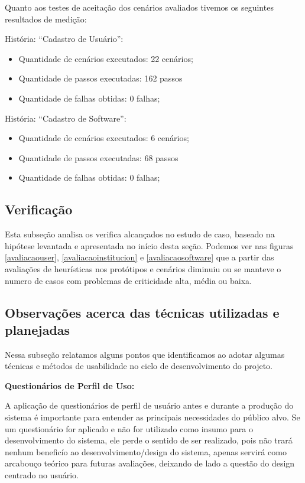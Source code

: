 \newpage
Quanto aos testes de aceitação dos cenários avaliados tivemos os seguintes resultados de medição:

História: ``Cadastro de Usuário'':
\begin{itemize}
	\item Quantidade de cenários executados: 22 cenários;
	\item Quantidade de passos executadas: 162 passos
	\item Quantidade de falhas obtidas: 0 falhas;
\end{itemize} 

História: ``Cadastro de Software'':
\begin{itemize}
	\item Quantidade de cenários executados: 6 cenários;
	\item Quantidade de passos executadas: 68 passos
	\item Quantidade de falhas obtidas: 0 falhas;
\end{itemize} 

\subsection{Verificação}

Esta subseção analisa os verifica alcançados no estudo de caso, baseado na hipótese levantada e apresentada no início desta seção. Podemos ver nas figuras \ref{avaliacaouser}, \ref{avaliacaoinstitucion} e \ref{avaliacaosoftware} que a partir das avaliações de heurísticas nos protótipos e cenários diminuiu ou se manteve o numero de casos com problemas de criticidade alta, média ou baixa. 

\subsection{Observações acerca das técnicas utilizadas e planejadas}

	Nessa subseção relatamos alguns pontos que identificamos ao adotar algumas técnicas e métodos de usabilidade no ciclo de desenvolvimento do projeto.

	\textbf{Questionários de Perfil de Uso:}

	A aplicação de questionários de perfil de usuário antes e durante a produção do sistema é importante para entender as principais necessidades do público alvo. Se um questionário for aplicado e não for utilizado como insumo para o desenvolvimento do sistema, ele perde o sentido de ser realizado, pois não trará nenhum beneficío ao desenvolvimento/design do sistema, apenas servirá como arcabouço teórico para futuras avaliações, deixando de lado a questão do design centrado no usuário.

